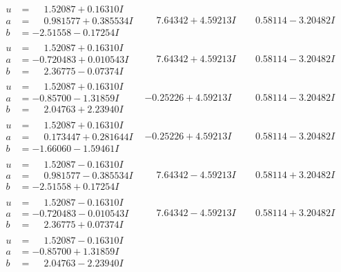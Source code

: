 \documentclass[1p]{elsarticle_modified}
\theoremstyle{definition}
\begin{document}
$$\begin{array}{c|c|c}
\begin{aligned}
u &= \phantom{-}1.52087 + 0.16310 I \\
a &= \phantom{-}0.981577 + 0.385534 I \\
b &= -2.51558 - 0.17254 I\end{aligned}
 & \phantom{-}7.64342 + 4.59213 I & \phantom{-}0.58114 - 3.20482 I \\ \hline\begin{aligned}
u &= \phantom{-}1.52087 + 0.16310 I \\
a &= -0.720483 + 0.010543 I \\
b &= \phantom{-}2.36775 - 0.07374 I\end{aligned}
 & \phantom{-}7.64342 + 4.59213 I & \phantom{-}0.58114 - 3.20482 I \\ \hline\begin{aligned}
u &= \phantom{-}1.52087 + 0.16310 I \\
a &= -0.85700 - 1.31859 I \\
b &= \phantom{-}2.04763 + 2.23940 I\end{aligned}
 & -0.25226 + 4.59213 I & \phantom{-}0.58114 - 3.20482 I \\ \hline\begin{aligned}
u &= \phantom{-}1.52087 + 0.16310 I \\
a &= \phantom{-}0.173447 + 0.281644 I \\
b &= -1.66060 - 1.59461 I\end{aligned}
 & -0.25226 + 4.59213 I & \phantom{-}0.58114 - 3.20482 I \\ \hline\begin{aligned}
u &= \phantom{-}1.52087 - 0.16310 I \\
a &= \phantom{-}0.981577 - 0.385534 I \\
b &= -2.51558 + 0.17254 I\end{aligned}
 & \phantom{-}7.64342 - 4.59213 I & \phantom{-}0.58114 + 3.20482 I \\ \hline\begin{aligned}
u &= \phantom{-}1.52087 - 0.16310 I \\
a &= -0.720483 - 0.010543 I \\
b &= \phantom{-}2.36775 + 0.07374 I\end{aligned}
 & \phantom{-}7.64342 - 4.59213 I & \phantom{-}0.58114 + 3.20482 I \\ \hline\begin{aligned}
u &= \phantom{-}1.52087 - 0.16310 I \\
a &= -0.85700 + 1.31859 I \\
b &= \phantom{-}2.04763 - 2.23940 I\end{aligned}

\end{array}$$
\end{document}
